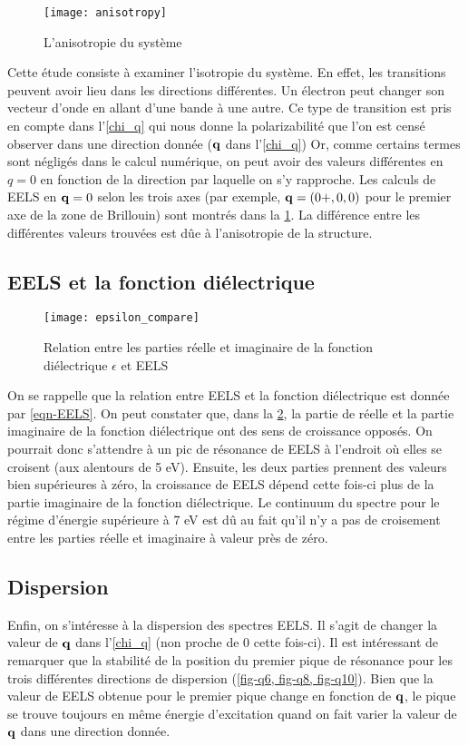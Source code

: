 \begin{figure}[!h]\label{fig-anisotropie}
    \centering
    \texttt{[image: anisotropy]}
    \caption{L'anisotropie du système}
\end{figure}

Cette étude consiste à examiner l'isotropie du système.
En effet, les transitions peuvent avoir lieu dans les directions différentes.
Un électron peut changer son vecteur d'onde en allant d'une bande à une autre.
Ce type de transition est pris en compte dans l'\cref{chi_q} qui nous donne la polarizabilité
que l'on est censé observer dans une direction donnée ($\vb{q}$ dans l'\cref{chi_q})
Or, comme certains termes sont négligés dans le calcul numérique,
on peut avoir des valeurs différentes en $q = 0$ en fonction de la direction par laquelle on s'y rapproche.
Les calculs de EELS en $\vb{q} = 0$ selon les trois axes
(par exemple, $\vb{q}=(0+,0,0)$ pour le premier axe de la zone de Brillouin)
sont montrés dans la \cref{fig-anisotropie}.
La différence entre les différentes valeurs trouvées est dûe à l'anisotropie de la structure.

\subsection{EELS et la fonction diélectrique}

\begin{figure}[!h]\label{fig-epsilon_compare}
    \centering
    \texttt{[image: epsilon\_compare]}
    \caption{Relation entre les parties réelle et imaginaire de la fonction diélectrique $\epsilon$ et EELS}
\end{figure}

On se rappelle que la relation entre EELS et la fonction diélectrique est donnée par \cref{eqn-EELS}.
On peut constater que, dans la \cref{fig-epsilon_compare}, la partie de réelle et
la partie imaginaire de la fonction diélectrique ont des sens de croissance opposés.
On pourrait donc s'attendre à un pic de résonance de EELS à l'endroit où elles se croisent
(aux alentours de 5 eV).
Ensuite, les deux parties prennent des valeurs bien supérieures à zéro,
la croissance de EELS dépend cette fois-ci plus de la partie imaginaire de la fonction diélectrique.
Le continuum du spectre pour le régime d'énergie supérieure à 7 eV est dû au fait
qu'il n'y a pas de croisement entre les parties réelle et imaginaire à valeur près de zéro.

\subsection{Dispersion}
Enfin, on s'intéresse à la dispersion des spectres EELS\@.
Il s'agit de changer la valeur de $\vb{q}$ dans l'\cref{chi_q} (non proche de 0 cette fois-ci).
Il est intéressant de remarquer que la stabilité de la position du premier pique de résonance
pour les trois différentes directions de dispersion (\cref{fig-q6, fig-q8, fig-q10}).
Bien que la valeur de EELS obtenue pour le premier pique change en fonction de $\vb{q}$,
le pique se trouve toujours en même énergie d'excitation
quand on fait varier la valeur de $\vb{q}$ dans une direction donnée.

